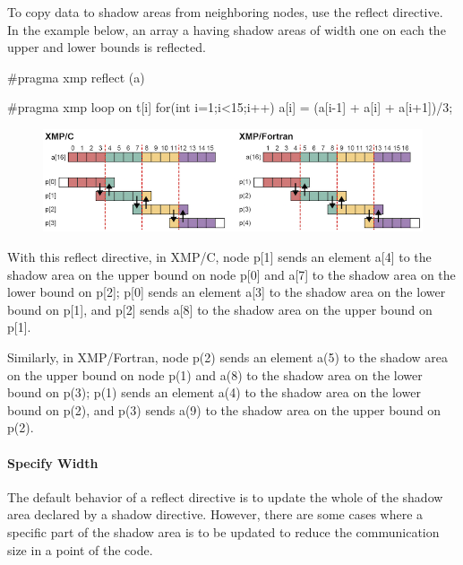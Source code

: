 To copy data to shadow areas from neighboring nodes, use the reflect
directive. In the example below, an array a having shadow areas of width
one on each the upper and lower bounds is reflected.

\begin{XCexample}
#pragma xmp reflect (a)

#pragma xmp loop on t[i]
for(int i=1;i<15;i++)
  a[i] = (a[i-1] + a[i] + a[i+1])/3;
\end{XCexample}


\begin{figure}
  \centering
  \includegraphics{figs/reflect.png}
\end{figure}

With this reflect directive, in XMP/C, node p[1] sends an element a[4]
to the shadow area on the upper bound on node p[0] and a[7] to the
shadow area on the lower bound on p[2]; p[0] sends an element a[3] to
the shadow area on the lower bound on p[1], and p[2] sends a[8] to the
shadow area on the upper bound on p[1].

Similarly, in XMP/Fortran, node p(2) sends an element a(5) to the shadow
area on the upper bound on node p(1) and a(8) to the shadow area on the
lower bound on p(3); p(1) sends an element a(4) to the shadow area on
the lower bound on p(2), and p(3) sends a(9) to the shadow area on the
upper bound on p(2).

\paragraph{Specify Width}

The default behavior of a reflect directive is to update the whole of
the shadow area declared by a shadow directive. However, there are some
cases where a specific part of the shadow area is to be updated to
reduce the communication size in a point of the code.

